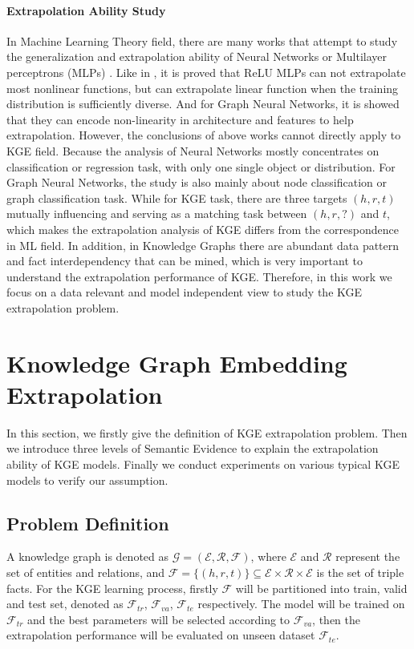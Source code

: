 \documentclass[letterpaper]{article} \usepackage{aaai22}  \usepackage{times}  \usepackage{helvet}  \usepackage{courier}  \usepackage[hyphens]{url}  \usepackage{graphicx} \urlstyle{rm} \def\UrlFont{\rm}  \usepackage{natbib}  \usepackage{caption} \DeclareCaptionStyle{ruled}{labelfont=normalfont,labelsep=colon,strut=off} \frenchspacing  \setlength{\pdfpagewidth}{8.5in}  \setlength{\pdfpageheight}{11in}  \usepackage{algorithm}
\begin{document}
\paragraph{Extrapolation Ability Study}
In Machine Learning Theory field, there are many works that attempt to study the generalization and extrapolation ability of Neural Networks or Multilayer perceptrons (MLPs) \cite{IJCNN_1992_Haley_Extrapolation, CSM_1992_Barnard_Extrapolation, NeurIPS_2019_Bietti_Inductive, ICLR_2020_Ba_Generalization, ICLR_2021_Xu_NNExtrapolate}. Like in \cite{ICLR_2021_Xu_NNExtrapolate}, it is proved that ReLU MLPs can not extrapolate most nonlinear functions, but can extrapolate linear function when the training distribution is sufficiently diverse. And for Graph Neural Networks, it is showed that they can encode non-linearity in architecture and features to help extrapolation. However, the conclusions of above works cannot directly apply to KGE field. Because the analysis of Neural Networks mostly concentrates on classification or regression task, with only one single object or distribution. For Graph Neural Networks, the study is also mainly about node classification or graph classification task. While for KGE task, there are three targets $(h, r, t)$ mutually influencing and serving as a matching task between $(h, r, ?)$ and $t$, which makes the extrapolation analysis of KGE differs from the correspondence in ML field. In addition, in Knowledge Graphs there are abundant data pattern and fact interdependency that can be mined, which is very important to understand the extrapolation performance of KGE. Therefore, in this work we focus on a data relevant and model independent view to study the KGE extrapolation problem. 

\section{Knowledge Graph Embedding Extrapolation}
\label{sec: KGE Extrapolation}
In this section, we firstly give the definition of KGE extrapolation problem. Then we introduce three levels of Semantic Evidence to explain the extrapolation ability of KGE models. Finally we conduct experiments on various typical KGE models to verify our assumption.

\subsection{Problem Definition}
A knowledge graph is denoted as $\mathcal{G}=(\mathcal{E}, \mathcal{R}, \mathcal{F})$, where $\mathcal{E}$ and $\mathcal{R}$ represent the set of entities and relations, and $\mathcal{F} = \{(h, r, t)\} \subseteq \mathcal{E} \times \mathcal{R} \times \mathcal{E}$ is the set of triple facts. For the KGE learning process, firstly $\mathcal{F}$ will be partitioned into train, valid and test set, denoted as $\mathcal{F}_{tr}$, $\mathcal{F}_{va}$, $\mathcal{F}_{te}$ respectively. The model will be trained on $\mathcal{F}_{tr}$ and the best parameters will be selected according to $\mathcal{F}_{va}$, then the extrapolation performance will be evaluated on unseen dataset $\mathcal{F}_{te}$. 
\end{document}
